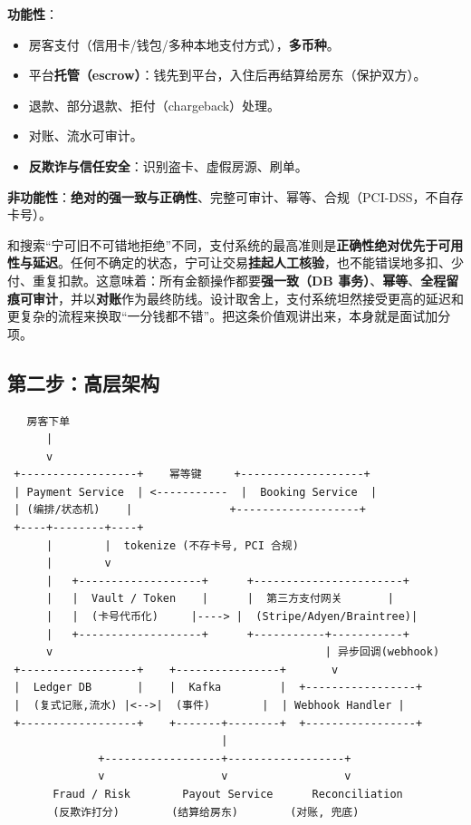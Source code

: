 \textbf{功能性}：

\begin{itemize}
  \item 房客支付（信用卡/钱包/多种本地支付方式），\textbf{多币种}。
  \item 平台\textbf{托管（escrow）}：钱先到平台，入住后再结算给房东（保护双方）。
  \item 退款、部分退款、拒付（chargeback）处理。
  \item 对账、流水可审计。
  \item \textbf{反欺诈与信任安全}：识别盗卡、虚假房源、刷单。
\end{itemize}

\textbf{非功能性}：\textbf{绝对的强一致与正确性}、完整可审计、幂等、合规（PCI-DSS，不自存卡号）。

\begin{idea}
和搜索“宁可旧不可错地拒绝”不同，支付系统的最高准则是\textbf{正确性绝对优先于可用性与延迟}。任何不确定的状态，宁可让交易\textbf{挂起人工核验}，也不能错误地多扣、少付、重复扣款。这意味着：所有金额操作都要\textbf{强一致（DB 事务）}、\textbf{幂等}、\textbf{全程留痕可审计}，并以\textbf{对账}作为最终防线。设计取舍上，支付系统坦然接受更高的延迟和更复杂的流程来换取“一分钱都不错”。把这条价值观讲出来，本身就是面试加分项。
\end{idea}

\subsection{第二步：高层架构}

\begin{lstlisting}
   房客下单
      |
      v
 +------------------+    幂等键     +-------------------+
 | Payment Service  | <-----------  |  Booking Service  |
 | (编排/状态机)    |               +-------------------+
 +----+--------+----+
      |        |  tokenize (不存卡号, PCI 合规)
      |        v
      |   +-------------------+      +-----------------------+
      |   |  Vault / Token    |      |  第三方支付网关       |
      |   |  (卡号代币化)     |----> |  (Stripe/Adyen/Braintree)|
      |   +-------------------+      +-----------+-----------+
      v                                          | 异步回调(webhook)
 +------------------+    +----------------+       v
 |  Ledger DB       |    |  Kafka         |  +-----------------+
 |  (复式记账,流水) |<-->|  (事件)        |  | Webhook Handler |
 +------------------+    +-------+--------+  +-----------------+
                                 |
              +------------------+------------------+
              v                  v                  v
       Fraud / Risk        Payout Service      Reconciliation
       (反欺诈打分)        (结算给房东)        (对账, 兜底)
\end{lstlisting}

